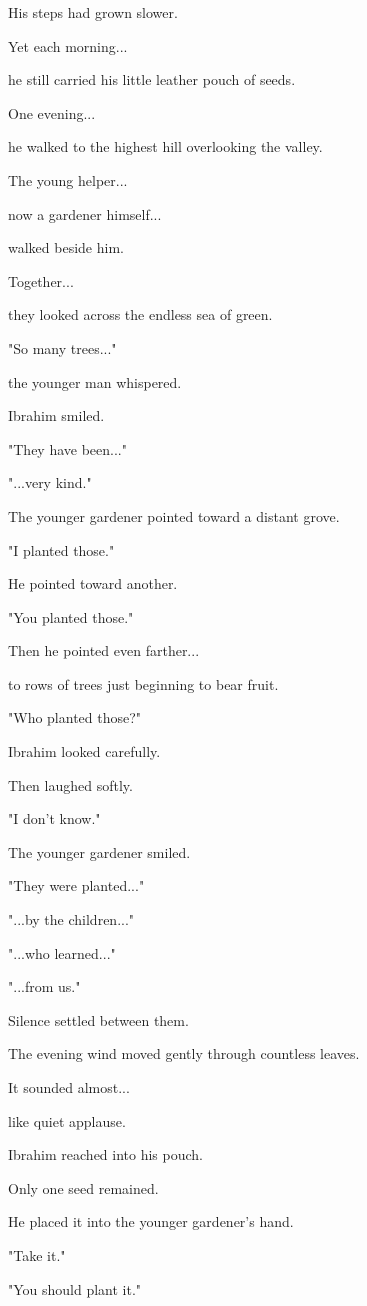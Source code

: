 \documentclass[12pt,openany]{book}
\begin{document}
His steps had grown slower.

Yet each morning...

he still carried his little leather pouch of seeds.

One evening...

he walked to the highest hill overlooking the valley.

The young helper...

now a gardener himself...

walked beside him.

Together...

they looked across the endless sea of green.

"So many trees..."

the younger man whispered.

Ibrahim smiled.

"They have been..."

"...very kind."

The younger gardener pointed toward a distant grove.

"I planted those."

He pointed toward another.

"You planted those."

Then he pointed even farther...

to rows of trees just beginning to bear fruit.

"Who planted those?"

Ibrahim looked carefully.

Then laughed softly.

"I don't know."

The younger gardener smiled.

"They were planted..."

"...by the children..."

"...who learned..."

"...from us."

Silence settled between them.

The evening wind moved gently through countless leaves.

It sounded almost...

like quiet applause.

Ibrahim reached into his pouch.

Only one seed remained.

He placed it into the younger gardener's hand.

"Take it."

"You should plant it."
\end{document}
